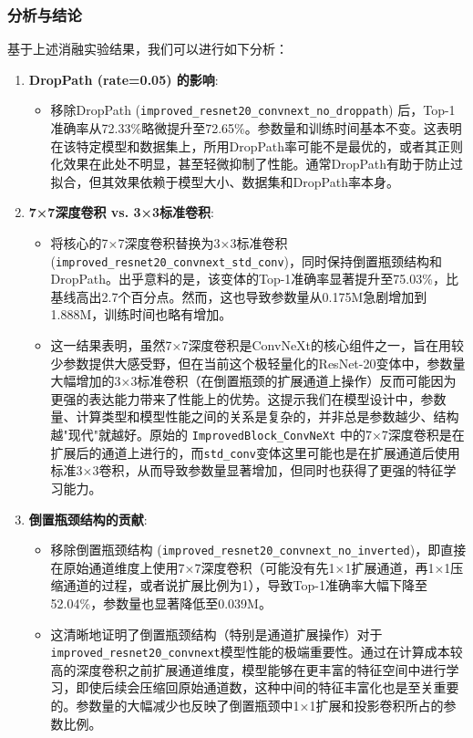\documentclass[a4paper]{article}
\begin{document}
\subsubsection{分析与结论}
基于上述消融实验结果，我们可以进行如下分析：
\begin{enumerate}
    \item \textbf{DropPath (rate=0.05) 的影响}:
    \begin{itemize}
        \item 移除DropPath (\texttt{improved\_resnet20\_convnext\_no\_droppath}) 后，Top-1准确率从72.33\%略微提升至72.65\%。参数量和训练时间基本不变。这表明在该特定模型和数据集上，所用DropPath率可能不是最优的，或者其正则化效果在此处不明显，甚至轻微抑制了性能。通常DropPath有助于防止过拟合，但其效果依赖于模型大小、数据集和DropPath率本身。
    \end{itemize}
    \item \textbf{7×7深度卷积 vs. 3×3标准卷积}:
    \begin{itemize}
        \item 将核心的7×7深度卷积替换为3×3标准卷积 (\texttt{improved\_resnet20\_convnext\_std\_conv})，同时保持倒置瓶颈结构和DropPath。出乎意料的是，该变体的Top-1准确率显著提升至75.03\%，比基线高出2.7个百分点。然而，这也导致参数量从0.175M急剧增加到1.888M，训练时间也略有增加。
        \item 这一结果表明，虽然7×7深度卷积是ConvNeXt的核心组件之一，旨在用较少参数提供大感受野，但在当前这个极轻量化的ResNet-20变体中，参数量大幅增加的3×3标准卷积（在倒置瓶颈的扩展通道上操作）反而可能因为更强的表达能力带来了性能上的优势。这提示我们在模型设计中，参数量、计算类型和模型性能之间的关系是复杂的，并非总是参数越少、结构越"现代"就越好。原始的 \texttt{ImprovedBlock\_ConvNeXt} 中的7×7深度卷积是在扩展后的通道上进行的，而\texttt{std\_conv}变体这里可能也是在扩展通道后使用标准3×3卷积，从而导致参数量显著增加，但同时也获得了更强的特征学习能力。
    \end{itemize}
    \item \textbf{倒置瓶颈结构的贡献}:
    \begin{itemize}
        \item 移除倒置瓶颈结构 (\texttt{improved\_resnet20\_convnext\_no\_inverted})，即直接在原始通道维度上使用7×7深度卷积（可能没有先1×1扩展通道，再1×1压缩通道的过程，或者说扩展比例为1），导致Top-1准确率大幅下降至52.04\%，参数量也显著降低至0.039M。
        \item 这清晰地证明了倒置瓶颈结构（特别是通道扩展操作）对于\texttt{improved\_resnet20\_convnext}模型性能的极端重要性。通过在计算成本较高的深度卷积之前扩展通道维度，模型能够在更丰富的特征空间中进行学习，即使后续会压缩回原始通道数，这种中间的特征丰富化也是至关重要的。参数量的大幅减少也反映了倒置瓶颈中1×1扩展和投影卷积所占的参数比例。
    \end{itemize}
\end{enumerate}
\end{document}
